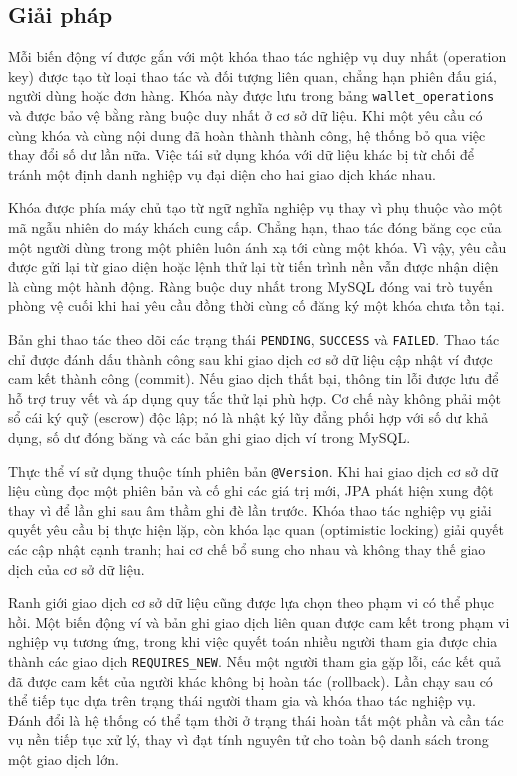 \documentclass[../DoAn.tex]{subfiles}
\begin{document}
\subsection{Giải pháp}

Mỗi biến động ví được gắn với một khóa thao tác nghiệp vụ duy nhất (operation key) được tạo từ loại thao tác và đối tượng liên quan, chẳng hạn phiên đấu giá, người dùng hoặc đơn hàng. Khóa này được lưu trong bảng \texttt{wallet\_operations} và được bảo vệ bằng ràng buộc duy nhất ở cơ sở dữ liệu. Khi một yêu cầu có cùng khóa và cùng nội dung đã hoàn thành thành công, hệ thống bỏ qua việc thay đổi số dư lần nữa. Việc tái sử dụng khóa với dữ liệu khác bị từ chối để tránh một định danh nghiệp vụ đại diện cho hai giao dịch khác nhau.

Khóa được phía máy chủ tạo từ ngữ nghĩa nghiệp vụ thay vì phụ thuộc vào một mã ngẫu nhiên do máy khách cung cấp. Chẳng hạn, thao tác đóng băng cọc của một người dùng trong một phiên luôn ánh xạ tới cùng một khóa. Vì vậy, yêu cầu được gửi lại từ giao diện hoặc lệnh thử lại từ tiến trình nền vẫn được nhận diện là cùng một hành động. Ràng buộc duy nhất trong MySQL đóng vai trò tuyến phòng vệ cuối khi hai yêu cầu đồng thời cùng cố đăng ký một khóa chưa tồn tại.

Bản ghi thao tác theo dõi các trạng thái \texttt{PENDING}, \texttt{SUCCESS} và \texttt{FAILED}. Thao tác chỉ được đánh dấu thành công sau khi giao dịch cơ sở dữ liệu cập nhật ví được cam kết thành công (commit). Nếu giao dịch thất bại, thông tin lỗi được lưu để hỗ trợ truy vết và áp dụng quy tắc thử lại phù hợp. Cơ chế này không phải một sổ cái ký quỹ (escrow) độc lập; nó là nhật ký lũy đẳng phối hợp với số dư khả dụng, số dư đóng băng và các bản ghi giao dịch ví trong MySQL.

Thực thể ví sử dụng thuộc tính phiên bản \texttt{@Version}. Khi hai giao dịch cơ sở dữ liệu cùng đọc một phiên bản và cố ghi các giá trị mới, JPA phát hiện xung đột thay vì để lần ghi sau âm thầm ghi đè lần trước. Khóa thao tác nghiệp vụ giải quyết yêu cầu bị thực hiện lặp, còn khóa lạc quan (optimistic locking) giải quyết các cập nhật cạnh tranh; hai cơ chế bổ sung cho nhau và không thay thế giao dịch của cơ sở dữ liệu.

Ranh giới giao dịch cơ sở dữ liệu cũng được lựa chọn theo phạm vi có thể phục hồi. Một biến động ví và bản ghi giao dịch liên quan được cam kết trong phạm vi nghiệp vụ tương ứng, trong khi việc quyết toán nhiều người tham gia được chia thành các giao dịch \texttt{REQUIRES\_NEW}. Nếu một người tham gia gặp lỗi, các kết quả đã được cam kết của người khác không bị hoàn tác (rollback). Lần chạy sau có thể tiếp tục dựa trên trạng thái người tham gia và khóa thao tác nghiệp vụ. Đánh đổi là hệ thống có thể tạm thời ở trạng thái hoàn tất một phần và cần tác vụ nền tiếp tục xử lý, thay vì đạt tính nguyên tử cho toàn bộ danh sách trong một giao dịch lớn.
\end{document}
